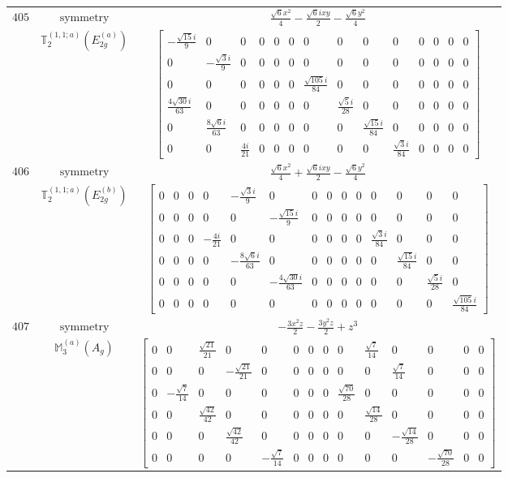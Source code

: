 \documentclass[fleqn,8pt,landscape]{jsarticle}
\begin{document}
\begin{longtable}{ccc}
$ 405 $ & $ \text{symmetry} $ & $ \frac{\sqrt{6} x^{2}}{4} - \frac{\sqrt{6} i x y}{2} - \frac{\sqrt{6} y^{2}}{4} $ \\
$  $ & $ \mathbb{T}_{2}^{(1,1;a)}(E_{2g}^{(a)}) $ & $ \begin{bmatrix} - \frac{\sqrt{15} i}{9} & 0 & 0 & 0 & 0 & 0 & 0 & 0 & 0 & 0 & 0 & 0 & 0 & 0 \\ 0 & - \frac{\sqrt{3} i}{9} & 0 & 0 & 0 & 0 & 0 & 0 & 0 & 0 & 0 & 0 & 0 & 0 \\ 0 & 0 & 0 & 0 & 0 & 0 & \frac{\sqrt{105} i}{84} & 0 & 0 & 0 & 0 & 0 & 0 & 0 \\ \frac{4 \sqrt{30} i}{63} & 0 & 0 & 0 & 0 & 0 & 0 & \frac{\sqrt{5} i}{28} & 0 & 0 & 0 & 0 & 0 & 0 \\ 0 & \frac{8 \sqrt{6} i}{63} & 0 & 0 & 0 & 0 & 0 & 0 & \frac{\sqrt{15} i}{84} & 0 & 0 & 0 & 0 & 0 \\ 0 & 0 & \frac{4 i}{21} & 0 & 0 & 0 & 0 & 0 & 0 & \frac{\sqrt{3} i}{84} & 0 & 0 & 0 & 0 \end{bmatrix} $ \\ \hline
$ 406 $ & $ \text{symmetry} $ & $ \frac{\sqrt{6} x^{2}}{4} + \frac{\sqrt{6} i x y}{2} - \frac{\sqrt{6} y^{2}}{4} $ \\
$  $ & $ \mathbb{T}_{2}^{(1,1;a)}(E_{2g}^{(b)}) $ & $ \begin{bmatrix} 0 & 0 & 0 & 0 & - \frac{\sqrt{3} i}{9} & 0 & 0 & 0 & 0 & 0 & 0 & 0 & 0 & 0 \\ 0 & 0 & 0 & 0 & 0 & - \frac{\sqrt{15} i}{9} & 0 & 0 & 0 & 0 & 0 & 0 & 0 & 0 \\ 0 & 0 & 0 & - \frac{4 i}{21} & 0 & 0 & 0 & 0 & 0 & 0 & \frac{\sqrt{3} i}{84} & 0 & 0 & 0 \\ 0 & 0 & 0 & 0 & - \frac{8 \sqrt{6} i}{63} & 0 & 0 & 0 & 0 & 0 & 0 & \frac{\sqrt{15} i}{84} & 0 & 0 \\ 0 & 0 & 0 & 0 & 0 & - \frac{4 \sqrt{30} i}{63} & 0 & 0 & 0 & 0 & 0 & 0 & \frac{\sqrt{5} i}{28} & 0 \\ 0 & 0 & 0 & 0 & 0 & 0 & 0 & 0 & 0 & 0 & 0 & 0 & 0 & \frac{\sqrt{105} i}{84} \end{bmatrix} $ \\ \hline
$ 407 $ & $ \text{symmetry} $ & $ - \frac{3 x^{2} z}{2} - \frac{3 y^{2} z}{2} + z^{3} $ \\
$  $ & $ \mathbb{M}_{3}^{(a)}(A_{g}) $ & $ \begin{bmatrix} 0 & 0 & \frac{\sqrt{21}}{21} & 0 & 0 & 0 & 0 & 0 & 0 & \frac{\sqrt{7}}{14} & 0 & 0 & 0 & 0 \\ 0 & 0 & 0 & - \frac{\sqrt{21}}{21} & 0 & 0 & 0 & 0 & 0 & 0 & \frac{\sqrt{7}}{14} & 0 & 0 & 0 \\ 0 & - \frac{\sqrt{7}}{14} & 0 & 0 & 0 & 0 & 0 & 0 & \frac{\sqrt{70}}{28} & 0 & 0 & 0 & 0 & 0 \\ 0 & 0 & \frac{\sqrt{42}}{42} & 0 & 0 & 0 & 0 & 0 & 0 & \frac{\sqrt{14}}{28} & 0 & 0 & 0 & 0 \\ 0 & 0 & 0 & \frac{\sqrt{42}}{42} & 0 & 0 & 0 & 0 & 0 & 0 & - \frac{\sqrt{14}}{28} & 0 & 0 & 0 \\ 0 & 0 & 0 & 0 & - \frac{\sqrt{7}}{14} & 0 & 0 & 0 & 0 & 0 & 0 & - \frac{\sqrt{70}}{28} & 0 & 0 \end{bmatrix} $ \\ \hline

\end{longtable}
\end{document}
